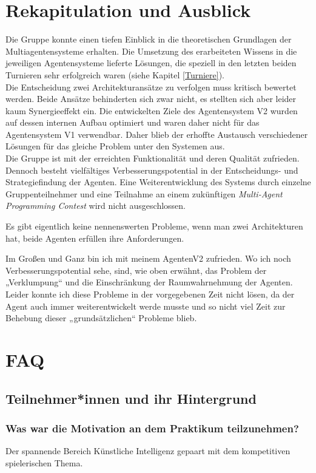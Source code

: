 \documentclass[runningheads]{llncs}
\begin{document}
\section{Rekapitulation und Ausblick}
Die Gruppe konnte einen tiefen Einblick in die theoretischen Grundlagen der Multiagentensysteme erhalten. Die Umsetzung des erarbeiteten Wissens in die jeweiligen Agentensysteme lieferte Lösungen, die speziell in den letzten beiden Turnieren sehr erfolgreich waren (siehe Kapitel \ref{Turniere}). \\
Die Entscheidung zwei Architekturansätze zu verfolgen muss kritisch bewertet werden. Beide Ansätze behinderten sich zwar nicht, es stellten sich aber leider kaum Synergieeffekt ein. Die entwickelten Ziele des Agentensystem V2 wurden auf dessen internen Aufbau optimiert und waren daher nicht für das Agentensystem V1 verwendbar. Daher blieb der erhoffte Austausch verschiedener Lösungen für das gleiche Problem unter den Systemen aus. \\
Die Gruppe ist mit der erreichten Funktionalität und deren Qualität zufrieden. Dennoch besteht vielfältiges Verbesserungspotential in der Entscheidungs- und Strategiefindung der Agenten.
Eine Weiterentwicklung des Systems durch einzelne Gruppenteilnehmer und eine Teilnahme an einem zukünftigen \textit{Multi-Agent Programming Contest} wird nicht ausgeschlossen.

Es gibt eigentlich keine nennenswerten Probleme, wenn man zwei Architekturen hat, beide Agenten erfüllen ihre Anforderungen. 

Im Großen und Ganz bin ich mit meinem AgentenV2 zufrieden. Wo ich noch Verbesserungspotential sehe, sind, wie oben erwähnt, das Problem der „Verklumpung“ und die Einschränkung der Raumwahrnehmung der Agenten. Leider konnte ich diese Probleme in der vorgegebenen Zeit nicht lösen, da der Agent auch immer weiterentwickelt werde musste und so nicht viel Zeit zur Behebung dieser „grundsätzlichen“ Probleme blieb.

\section{FAQ}
\subsection{Teilnehmer*innen und ihr Hintergrund}
\subsubsection{Was war die Motivation an dem Praktikum teilzunehmen?\\}
Der spannende Bereich Künstliche Intelligenz gepaart mit dem kompetitiven spielerischen Thema. \\
\end{document}
